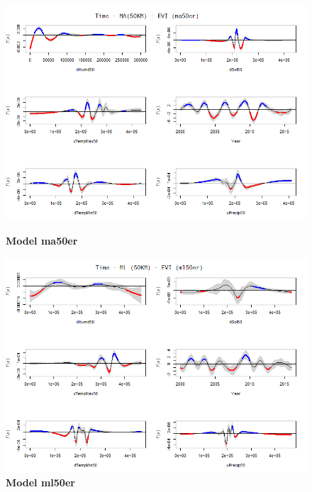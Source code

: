 \begin{figure}[H]
 \centering
    \begin{minipage}{0.8\textwidth}
        \centering
        \includegraphics[width=1.2\textwidth]{ma50er.png} %
        \caption{\textbf{Model ma50er}}
    \end{minipage}\hfill
    \begin{minipage}{0.8\textwidth}
        \centering
        \includegraphics[width=1.2\textwidth]{ml50er.png} %
        \caption{\textbf{Model ml50er}}
    \end{minipage}
\end{figure}

